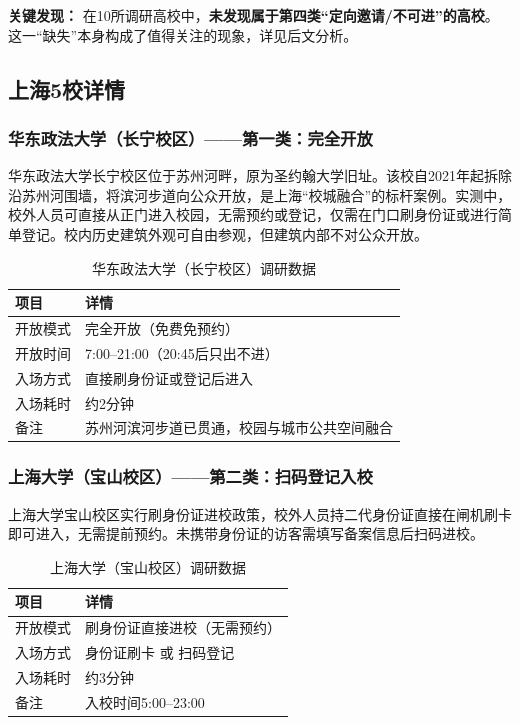 \documentclass[12pt]{article}
\begin{document}
\textbf{关键发现：} 在10所调研高校中，\textbf{未发现属于第四类“定向邀请/不可进”的高校}。这一“缺失”本身构成了值得关注的现象，详见后文分析。

\subsection{上海5校详情}

\subsubsection{华东政法大学（长宁校区）——第一类：完全开放}

华东政法大学长宁校区位于苏州河畔，原为圣约翰大学旧址。该校自2021年起拆除沿苏州河围墙，将滨河步道向公众开放，是上海“校城融合”的标杆案例。实测中，校外人员可直接从正门进入校园，无需预约或登记，仅需在门口刷身份证或进行简单登记。校内历史建筑外观可自由参观，但建筑内部不对公众开放。

\begin{table}[H]
\centering
\caption{华东政法大学（长宁校区）调研数据}
\label{tab:hz}
\begin{tabular}{p{3cm}p{7.5cm}}
\toprule
\textbf{项目} & \textbf{详情} \\
\midrule
开放模式 & 完全开放（免费免预约） \\
开放时间 & 7:00–21:00（20:45后只出不进） \\
入场方式 & 直接刷身份证或登记后进入 \\
入场耗时 & 约2分钟 \\
备注 & 苏州河滨河步道已贯通，校园与城市公共空间融合 \\
\bottomrule
\end{tabular}
\end{table}

\subsubsection{上海大学（宝山校区）——第二类：扫码登记入校}

上海大学宝山校区实行刷身份证进校政策，校外人员持二代身份证直接在闸机刷卡即可进入，无需提前预约。未携带身份证的访客需填写备案信息后扫码进校。

\begin{table}[H]
\centering
\caption{上海大学（宝山校区）调研数据}
\label{tab:shu}
\begin{tabular}{p{3cm}p{7.5cm}}
\toprule
\textbf{项目} & \textbf{详情} \\
\midrule
开放模式 & 刷身份证直接进校（无需预约） \\
入场方式 & 身份证刷卡 或 扫码登记 \\
入场耗时 & 约3分钟 \\
备注 & 入校时间5:00–23:00 \\
\bottomrule
\end{tabular}
\end{table}
\end{document}
